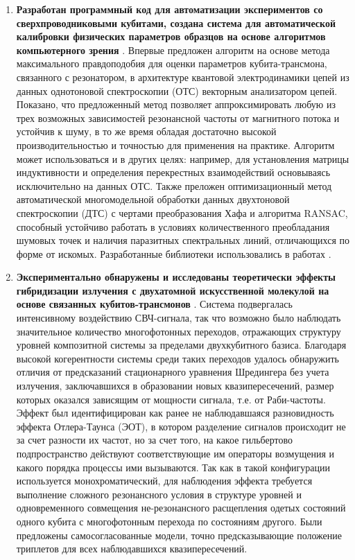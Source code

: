 \documentclass[14pt, a4paper]{extarticle}
\begin{document}
\begin{enumerate}
	\item \textbf{Разработан программный код для автоматизации экспериментов со сверхпроводниковыми кубитами, создана система для автоматической калибровки физических параметров образцов на основе алгоритмов компьютерного зрения} . Впервые предложен алгоритм на основе метода максимального правдоподобия для оценки параметров кубита-трансмона, связанного с резонатором, в архитектуре квантовой электродинамики цепей из данных однотоновой спектроскопии (ОТС) векторным анализатором цепей. Показано, что предложенный метод позволяет аппроксимировать любую из трех возможных зависимостей резонансной частоты от магнитного потока и устойчив к шуму, в то же время обладая достаточно высокой производительностью и точностью для применения на практике. Алгоритм может использоваться и в других целях: например, для установления матрицы индуктивности и определения перекрестных взаимодействий основываясь исключительно на данных ОТС. Также преложен оптимизационный метод автоматической многомодельной обработки данных двухтоновой спектроскопии (ДТС) с чертами преобразования Хафа и алгоритма RANSAC, способный устойчиво работать в условиях количественного преобладания шумовых точек и наличия паразитных спектральных линий, отличающихся по форме от искомых. Разработанные библиотеки использовались в работах .

\item \textbf{Экспериментально обнаружены и исследованы теоретически эффекты гибридизации излучения с двухатомной искусственной молекулой на основе связанных кубитов\hyp трансмонов} . Система подвергалась интенсивному воздействию СВЧ-сигнала, так что возможно было наблюдать значительное количество многофотонных переходов, отражающих структуру уровней композитной системы за пределами двухкубитного базиса. Благодаря высокой когерентности системы среди таких переходов удалось обнаружить отличия от предсказаний стационарного уравнения Шредингера без учета излучения, заключавшихся в образовании новых квазипересечений, размер которых оказался зависящим от мощности сигнала, т.е. от Раби-частоты. Эффект был идентифицирован как ранее не наблюдавшаяся разновидность эффекта Отлера-Таунса (ЭОТ), в котором разделение сигналов происходит не за счет разности их частот, но за счет того, на какое гильбертово подпространство действуют соответствующие им операторы возмущения и какого порядка процессы ими вызываются. Так как в такой конфигурации используется монохроматический, для наблюдения эффекта требуется выполнение сложного резонансного условия в структуре уровней и одновременного совмещения не-резонансного расщепления одетых состояний одного кубита с многофотонным перехода по состояниям другого. Были предложены самосогласованные модели, точно предсказывающие положение триплетов для всех наблюдавшихся квазипересечений.


\end{enumerate}
\end{document}
